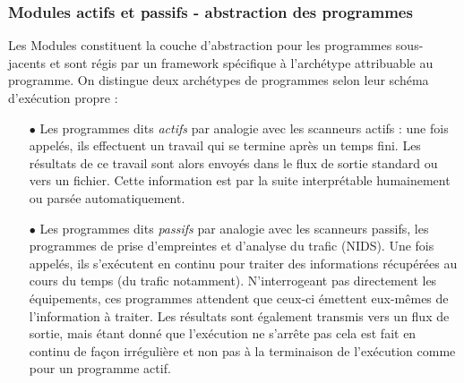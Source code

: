 \documentclass[]{article}
\begin{document}
\subsubsection{Modules actifs et passifs - abstraction des programmes}

Les Modules constituent la couche d'abstraction pour les programmes sous-jacents et sont régis par un framework spécifique à l'archétype attribuable au programme. On distingue deux archétypes de programmes selon leur schéma d'exécution propre :\\
\begin{itemize}
\item[$\bullet$] Les programmes dits \textit{actifs} par analogie avec les scanneurs actifs : une fois appelés, ils effectuent un travail qui se termine après un temps fini. Les résultats de ce travail sont alors envoyés dans le flux de sortie standard ou vers un fichier. Cette information est par la suite interprétable humainement ou parsée automatiquement.
\vspace{0.2cm}
\item[$\bullet$] Les programmes dits \textit{passifs} par analogie avec les scanneurs passifs, les programmes de prise d'empreintes et d'analyse du trafic (NIDS). Une fois appelés, ils s'exécutent en continu pour traiter des informations récupérées au cours du temps (du trafic notamment). N'interrogeant pas directement les équipements, ces programmes attendent que ceux-ci émettent eux-mêmes de l'information à traiter. Les résultats sont également transmis vers un flux de sortie, mais étant donné que l'exécution ne s'arrête pas cela est fait en continu de façon irrégulière et non pas à la terminaison de l'exécution comme pour un programme actif. 
\end{itemize}
\vspace{0.4cm}
\end{document}
